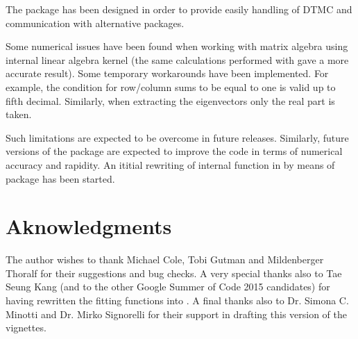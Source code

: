 \documentclass[nojss]{jss}
\begin{document}
The  package has been designed in order to provide easily handling of DTMC and communication with alternative packages.

Some numerical issues have been found when working with matrix algebra using
 internal linear algebra kernel (the same calculations performed
with  gave a more accurate result).
Some temporary workarounds have been implemented. For example, the condition for row/column sums to be equal to
one is valid up to fifth decimal. Similarly, when extracting the eigenvectors
only the real part is taken.

Such limitations are expected to be overcome in future releases. Similarly,
future versions of the package are expected to improve the code in terms of numerical accuracy and rapidity.
An ititial rewriting of internal function in  by means of  package \citep{RcppR} has been started.


\section*{Aknowledgments}\label{sec:aknowledgements}

The author wishes to thank Michael Cole, Tobi Gutman and Mildenberger Thoralf for their suggestions and bug checks. A very special thanks also to Tae Seung Kang (and to the other Google Summer of Code 2015 candidates) for having rewritten the fitting functions into . A final thanks also to Dr. Simona C. Minotti and Dr. Mirko Signorelli for their support in drafting this version of the vignettes.   


\end{document}
